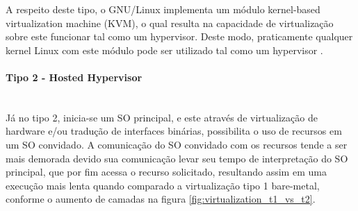 A respeito deste tipo, o GNU/Linux implementa um módulo kernel-based virtualization machine (KVM), o qual resulta na capacidade de virtualização sobre este funcionar tal como um hypervisor. Deste modo, praticamente qualquer kernel Linux com este módulo pode ser utilizado tal como um hypervisor \cite{what-is-KVM}.

\paragraph*{Tipo 2 - Hosted Hypervisor}\mbox{}\\
Já no tipo 2, inicia-se um SO principal, e este através de virtualização de hardware e/ou tradução de interfaces binárias, possibilita o uso de recursos em um SO convidado. A comunicação do SO convidado com os recursos tende a ser mais demorada devido sua comunicação levar seu tempo de interpretação do SO principal, que por fim acessa o recurso solicitado, resultando assim em uma execução mais lenta quando comparado a virtualização tipo 1 bare-metal, conforme o aumento de camadas na figura \ref{fig:virtualization_t1_vs_t2}.
